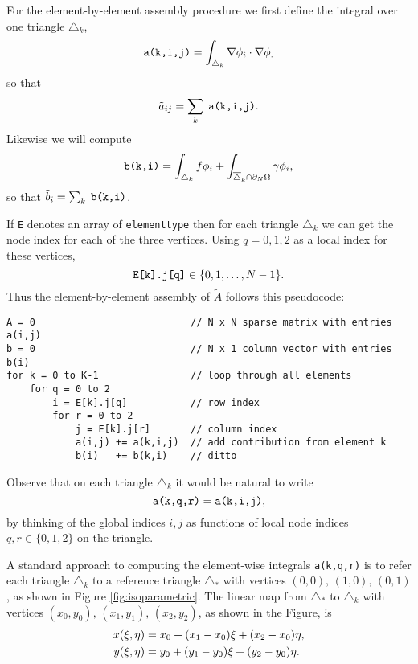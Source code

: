 For the element-by-element assembly procedure we first define the integral over one triangle $\triangle_k$,
\begin{equation}
\text{\texttt{a(k,i,j)}} = \int_{\triangle_k} \nabla \phi_i \cdot \nabla \phi_. \label{aelementintegral}
\end{equation}
so that
    $$\tilde a_{ij} = \sum_k \phantom{.}\text{\texttt{a(k,i,j)}}.$$
Likewise we will compute
\begin{equation}
\text{\texttt{b(k,i)}} = \int_{\triangle_k} f \phi_i + \int_{\overline{\triangle}_k \cap \partial_N\Omega} \gamma \phi_i, \label{belementintegral}
\end{equation}
so that $\tilde b_i = \sum_{k} \;\text{\texttt{b(k,i)}}$.

If \texttt{E} denotes an array of \texttt{elementtype} then for each triangle $\triangle_k$ we can get the node index for each of the three vertices.  Using $q=0,1,2$ as a local index for these vertices,
    $$\text{\texttt{E[k].j[q]}} \in \{0,1,\dots,N-1\}.$$
Thus the element-by-element assembly of $\tilde A$ follows this pseudocode:
\begin{Verbatim}[fontsize=\small]
A = 0                           // N x N sparse matrix with entries a(i,j)
b = 0                           // N x 1 column vector with entries b(i)
for k = 0 to K-1                // loop through all elements
    for q = 0 to 2
        i = E[k].j[q]           // row index
        for r = 0 to 2
            j = E[k].j[r]       // column index
            a(i,j) += a(k,i,j)  // add contribution from element k
            b(i)   += b(k,i)    // ditto
\end{Verbatim}
\medskip\noindent
Observe that on each triangle $\triangle_k$ it would be natural to write
    $$\text{\texttt{a(k,q,r)}} = \text{\texttt{a(k,i,j)}},$$
by thinking of the global indices $i,j$ as functions of local node indices $q,r\in\{0,1,2\}$ on the triangle.

A standard approach to computing the element-wise integrals \texttt{a(k,q,r)} is to refer each triangle $\triangle_k$ to a reference triangle $\triangle_\ast$ with vertices $(0,0),\,(1,0),\,(0,1)$, as shown in Figure \ref{fig:isoparametric}.  The linear map from $\triangle_\ast$ to $\triangle_k$ with vertices $(x_0,y_0),\,(x_1,y_1),\,(x_2,y_2)$, as shown in the Figure, is
\begin{align}
x(\xi,\eta) &= x_0 + (x_1-x_0) \xi + (x_2-x_0) \eta, \label{trianglemap} \\
y(\xi,\eta) &= y_0 + (y_1-y_0) \xi + (y_2-y_0) \eta. \notag
\end{align}

